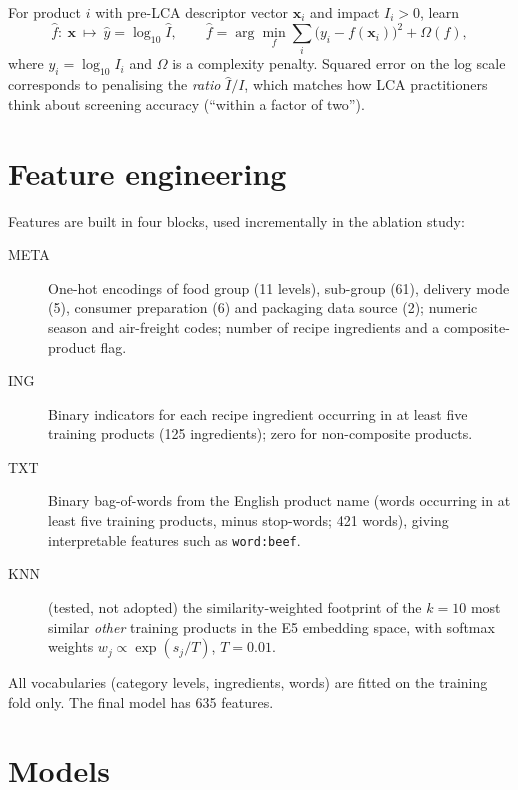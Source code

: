 For product $i$ with pre-LCA descriptor vector $\mathbf{x}_i$ and impact $I_i>0$, learn
\[
  \hat f:\ \mathbf{x}\ \mapsto\ \hat y = \log_{10}\hat I, \qquad
  \hat f = \arg\min_f \sum_i \big(y_i - f(\mathbf{x}_i)\big)^2 + \Omega(f),
\]
where $y_i=\log_{10} I_i$ and $\Omega$ is a complexity penalty. Squared error on the log scale
corresponds to penalising the \emph{ratio} $\hat I / I$, which matches how LCA practitioners think
about screening accuracy (``within a factor of two'').

\section{Feature engineering}

Features are built in four blocks, used incrementally in the ablation study:

\begin{description}
  \item[META] One-hot encodings of food group (11 levels), sub-group (61), delivery mode (5),
  consumer preparation (6) and packaging data source (2); numeric season and air-freight codes;
  number of recipe ingredients and a composite-product flag.
  \item[ING] Binary indicators for each recipe ingredient occurring in at least five training
  products (125 ingredients); zero for non-composite products.
  \item[TXT] Binary bag-of-words from the English product name (words occurring in at least five
  training products, minus stop-words; 421 words), giving interpretable features such as \texttt{word:beef}.
  \item[KNN] (tested, not adopted) the similarity-weighted footprint of the $k=10$ most similar
  \emph{other} training products in the E5 embedding space, with softmax weights
  $w_j \propto \exp(s_j/T)$, $T=0.01$.
\end{description}

All vocabularies (category levels, ingredients, words) are fitted on the training fold only. The
final model has 635 features.

\section{Models}

